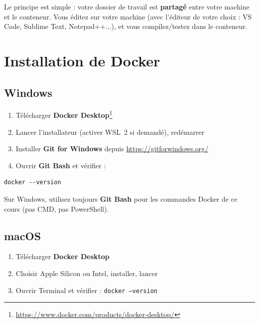 \documentclass[11pt,a4paper]{article}
\begin{document}
Le principe est simple : votre dossier de travail est \textbf{partagé} entre votre machine et le conteneur. Vous éditez sur votre machine (avec l'éditeur de votre choix : VS Code, Sublime Text, Notepad++...), et vous compilez/testez dans le conteneur.

\section{Installation de Docker}

\subsection{Windows}

\begin{enumerate}[nosep]
    \item Télécharger \textbf{Docker Desktop}\footnote{\url{https://www.docker.com/products/docker-desktop/}}
    \item Lancer l'installateur (activer WSL~2 si demandé), redémarrer
    \item Installer \textbf{Git for Windows} depuis \url{https://gitforwindows.org/}
    \item Ouvrir \textbf{Git Bash} et vérifier :
\end{enumerate}

\begin{lstlisting}[style=bash]
docker --version
\end{lstlisting}

\begin{attentionbox}
Sur Windows, utilisez toujours \textbf{Git Bash} pour les commandes Docker de ce cours (pas CMD, pas PowerShell).
\end{attentionbox}

\subsection{macOS}

\begin{enumerate}[nosep]
    \item Télécharger \textbf{Docker Desktop}\footnotemark[\value{footnote}]
    \item Choisir Apple Silicon ou Intel, installer, lancer
    \item Ouvrir Terminal et vérifier : \texttt{docker --version}
\end{enumerate}
\end{document}
